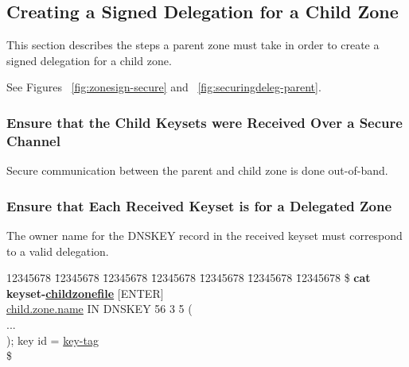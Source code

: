 
\clearpage
\subsection{Creating a Signed Delegation for a Child Zone}
\label{delegation-parent}

This section describes the steps a parent zone must take in order to create
a signed delegation for a child zone.

See Figures ~\ref{fig:zonesign-secure} and ~\ref{fig:securingdeleg-parent}.


\subsubsection{Ensure that the Child Keysets were Received Over a Secure Channel}

Secure communication between the parent and child zone is done out-of-band.


\subsubsection{Ensure that Each Received Keyset is for a Delegated Zone}

The owner name for the DNSKEY record in the received keyset must correspond
to a valid delegation.
\begin{tabbing}
\hspace{0.5in} 12345678 \= 12345678 \= 12345678 \= 12345678 \= 12345678 \= 12345678 \= 12345678 \kill
\hspace{0.5in}\$ {\bf cat keyset-\underline{childzonefile}} $[$ENTER$]$ \\
\hspace{0.5in} \underline{child.zone.name} \>  IN \> \> DNSKEY 56 3 5 (\\
\hspace{0.5in} \> \> \> \> ... \\
\hspace{0.5in} \> \> \> \> ); key id = \underline{key-tag} \\
\hspace{0.5in}\$ \\
\end{tabbing}

